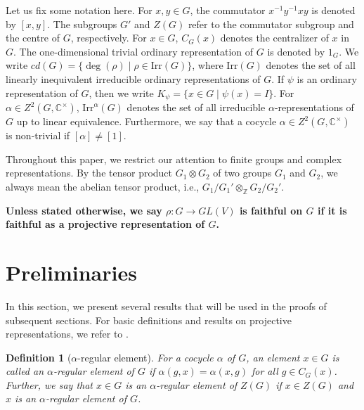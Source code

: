 \documentclass[a4paper,11pt]{amsart}
\numberwithin{equation}{section}
\numberwithin{equation}{subsection}
\newtheorem{definition}[theorem]{Definition}
\newcommand{\irr}{\mathrm{Irr}}
\begin{document}
	
	
	Let us fix some notation here. For $x,y\in G$, the commutator $x^{-1}y^{-1}xy$ is denoted by $[x,y]$. The subgroups $G'$ and $Z(G)$ refer to the commutator subgroup and the centre of $G$, respectively. For $x \in G$, $C_G(x)$ denotes the centralizer of $x$ in $G$. The one-dimensional trivial ordinary representation of $G$ is denoted by $1_G$. We write $cd(G)= \{\deg(\rho) \mid \rho \in \irr(G) \}$, where $\mathrm{Irr}(G)$ denotes the set of all linearly inequivalent irreducible ordinary representations of $G$. If $\psi$ is an ordinary representation of $G$, then we write $K_{\psi}= \{x \in G \mid \psi(x)=I\}$. For $\alpha \in Z^2(G,\mathbb C^\times)$, $\mathrm{Irr}^\alpha(G)$ denotes the set of all irreducible $\alpha$-representations of $G$ up to linear equivalence. Furthermore, we say that a cocycle $\alpha \in Z^{2}(G,\mathbb{C}^{\times})$ is non-trivial if $[\alpha] \neq [1]$.  
	
	Throughout this paper, we restrict our attention to finite groups and complex representations. 
	By the tensor product $G_1 \otimes G_2$ of two groups $G_1$ and $G_2$, we always mean the abelian tensor product, i.e., $G_1/G_1' \otimes_{\mathbb Z} G_2/G_2'$. \\
	
	\begin{mdframed}
		\textbf{Unless stated otherwise, we say $\rho: G \to GL(V)$ is faithful on $G$ if it is faithful as a projective representation of $G$.}
	\end{mdframed}
	
	\section{Preliminaries} \label{sec:Preliminaries}
	In this section, we present several results that will be used in the proofs of subsequent sections. For basic definitions and results on projective representations, we refer to \cite[Chapter 3]{karpilovsky}.
	\begin{definition}[$\alpha$-regular element]
		For a cocycle $\alpha$ of $G$, an element $x \in G$ is called an $\alpha$-regular element of $G$ if $\alpha(g,x) =\alpha(x,g)$ for all $g\in C_G(x)$. Further, we say that $x \in G$ is an $\alpha$-regular element of $Z(G)$ if $x \in Z(G)$ and $x$ is an $\alpha$-regular element of $G$.    
	\end{definition}
	
\end{document}
